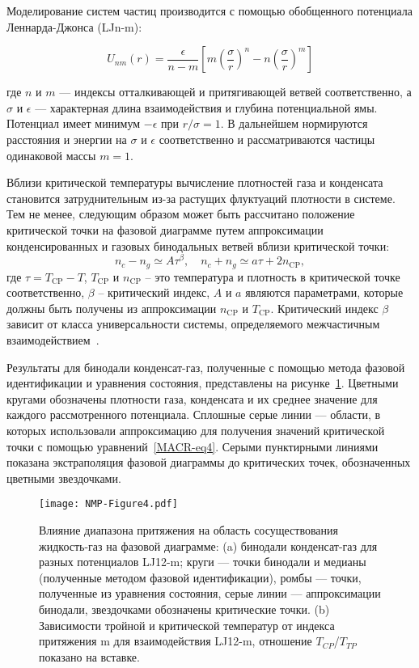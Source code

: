 Моделирование систем частиц производится с помощью обобщенного потенциала Леннарда-Джонса (LJn-m):

\begin{equation}
  U_{n m}(r)=\frac{\epsilon}{n-m}\left[m\left(\frac{\sigma}{r}\right)^{n}-n\left(\frac{\sigma}{r}\right)^{m}\right]
  \label{LJnm}
\end{equation}

где $n$ и $m$ — индексы отталкивающей и притягивающей ветвей соответственно, а $\sigma$ и $\epsilon$ — характерная длина взаимодействия и глубина потенциальной ямы.
Потенциал имеет минимум $-\epsilon$ при $r/\sigma=1$.
В дальнейшем нормируются расстояния и энергии на $\sigma$ и $\epsilon$ соответственно и рассматриваются частицы одинаковой массы $m=1$.

Вблизи критической температуры вычисление плотностей газа и конденсата становится затруднительным из-за растущих флуктуаций плотности в системе.
Тем не менее, следующим образом может быть рассчитано положение критической точки на фазовой диаграмме путем аппроксимации конденсированных и газовых бинодальных ветвей вблизи критической точки:
\begin{equation}
  n_{c}-n_{g} \simeq A \tau^{\beta}, \quad n_{c}+n_{g} \simeq a \tau+2 n_{\mathrm{CP}},
  \label{MACR-eq4}
\end{equation}
где $\tau=T_{\mathrm{CP}}-T$, $T_{\mathrm{CP}}$ и $n_{\mathrm{CP}}$ -- это температура и 
плотность в критической точке соответственно, $\beta$ -- критический индекс, $A$ и $a$ являются параметрами, которые должны быть получены из аппроксимации $n_{\mathrm{CP}}$ и $T_{\mathrm{CP}}$.
Критический индекс $\beta$ зависит от класса универсальности системы, определяемого межчастичным взаимодействием~\cite{10.1103/physrevlett.89.025703}.

Результаты для бинодали конденсат-газ, полученные с помощью метода фазовой идентификации и уравнения состояния, представлены на рисунке~\ref{nmp}.
Цветными кругами обозначены плотности газа, конденсата и их среднее значение для каждого рассмотренного потенциала. 
Сплошные серые линии — области, в которых использовали аппроксимацию для получения значений критической точки с помощью уравнений~\ref{MACR-eq4}. 
Серыми пунктирными линиями показана экстраполяция фазовой диаграммы до критических точек, обозначенных цветными звездочками.

\begin{figure}[!h]
  \begin{center}
    \texttt{[image: NMP-Figure4.pdf]}
    \caption{Влияние диапазона притяжения на область сосуществования жидкость-газ на фазовой диаграмме: (a) бинодали конденсат-газ для разных потенциалов LJ12-m; круги — точки бинодали и медианы (полученные методом фазовой идентификации), ромбы — точки, полученные из уравнения состояния, серые линии — аппроксимации бинодали, звездочками обозначены критические точки.
      (b) Зависимости тройной и критической температур от индекса притяжения m для взаимодействия LJ12-m, отношение $T_{CP}$/$T_{TP}$ показано на вставке.}
    \label{nmp}
  \end{center}
\end{figure}

